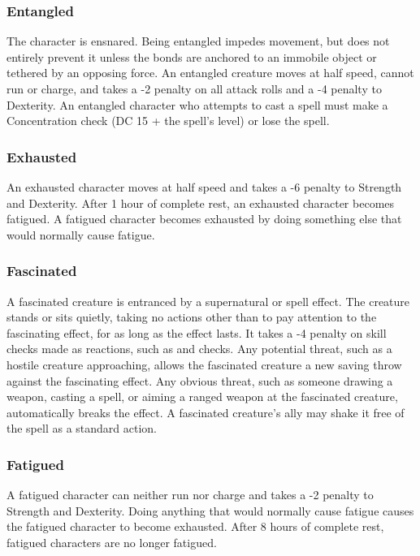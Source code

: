 \subsubsection{Entangled}

The character is ensnared. Being entangled impedes movement, 
but does not entirely prevent it unless the bonds are anchored to an immobile object 
or tethered by an opposing force. An entangled creature moves at half speed, cannot 
run or charge, and takes a -2 penalty on all attack rolls and a -4 penalty to Dexterity. 
An entangled character who attempts to cast a spell must make a Concentration check 
(DC 15 + the spell's level) or lose the spell. 

\subsubsection{Exhausted}

An exhausted character moves at half speed and takes a -6 penalty 
to Strength and Dexterity. After 1 hour of complete rest, an exhausted character 
becomes fatigued. A fatigued character becomes exhausted by doing something else 
that would normally cause fatigue.

\subsubsection{Fascinated}

A fascinated creature is entranced by a supernatural or spell 
effect. The creature stands or sits quietly, taking no actions other than to pay 
attention to the fascinating effect, for as long as the effect lasts. It takes 
a -4 penalty on skill checks made as reactions, such as  and  checks. 
Any potential threat, such as a hostile creature approaching, allows the fascinated 
creature a new saving throw against the fascinating effect. Any obvious threat, 
such as someone drawing a weapon, casting a spell, or aiming a ranged weapon at 
the fascinated creature, automatically breaks the effect. A fascinated creature's 
ally may shake it free of the spell as a standard action. 

\subsubsection{Fatigued}

A fatigued character can neither run nor charge and takes a 
-2 penalty to Strength and Dexterity. Doing anything that would normally cause 
fatigue causes the fatigued character to become exhausted. After 8 hours of complete 
rest, fatigued characters are no longer fatigued. 

